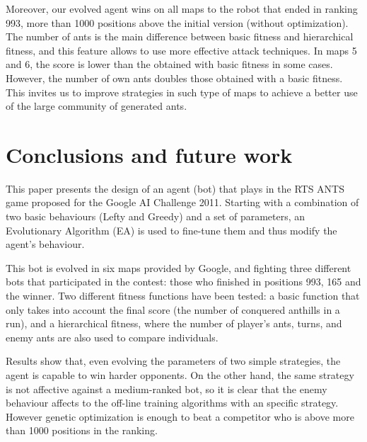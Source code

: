 \documentclass[runningheads]{llncs}
\begin{document}
Moreover, our evolved agent wins on all maps to the robot that ended in ranking 993, more than 1000 positions above the initial version (without optimization). The number of ants is the main difference between basic fitness and hierarchical fitness, and this feature allows to use more effective attack techniques. In maps 5 and 6, the score is lower than the obtained with basic fitness in some cases. However, the number of own ants doubles those obtained with a basic fitness. This invites us to improve strategies in such type of maps to achieve a better use of the large community of generated ants. 

%
%
%
%


\section{Conclusions and future work}

This paper presents the design of an agent (bot) that plays in the RTS ANTS game proposed for the Google AI Challenge 2011. Starting with a combination of two basic behaviours (Lefty and Greedy) and a set of parameters, an Evolutionary Algorithm (EA) is used to fine-tune them and thus modify the agent's behaviour. 

This bot is evolved in six maps provided by Google, and fighting three different bots that participated in the contest: those who finished in positions 993, 165 and the winner. 
Two different fitness functions have been tested: a basic function that only takes into account the final score (the number of conquered anthills in a run), and a hierarchical fitness, where the number of player's ants, turns, and enemy ants are also used to compare individuals.

Results show that, even evolving the parameters of two simple strategies, the agent is capable to win harder opponents. On the other hand, the same strategy is not affective against a medium-ranked bot, so it is clear that the enemy behaviour affects to the off-line training algorithms with an specific strategy.  However genetic optimization is enough to beat a competitor who is above more than 1000 positions in the ranking. 
\end{document}
